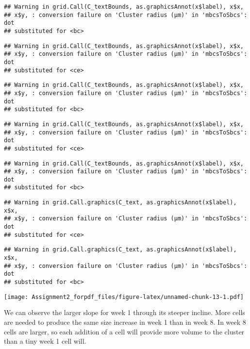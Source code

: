 \documentclass[]{article}
\begin{document}
\begin{verbatim}
## Warning in grid.Call(C_textBounds, as.graphicsAnnot(x$label), x$x,
## x$y, : conversion failure on 'Cluster radius (μm)' in 'mbcsToSbcs': dot
## substituted for <bc>
\end{verbatim}

\begin{verbatim}
## Warning in grid.Call(C_textBounds, as.graphicsAnnot(x$label), x$x,
## x$y, : conversion failure on 'Cluster radius (μm)' in 'mbcsToSbcs': dot
## substituted for <ce>
\end{verbatim}

\begin{verbatim}
## Warning in grid.Call(C_textBounds, as.graphicsAnnot(x$label), x$x,
## x$y, : conversion failure on 'Cluster radius (μm)' in 'mbcsToSbcs': dot
## substituted for <bc>
\end{verbatim}

\begin{verbatim}
## Warning in grid.Call(C_textBounds, as.graphicsAnnot(x$label), x$x,
## x$y, : conversion failure on 'Cluster radius (μm)' in 'mbcsToSbcs': dot
## substituted for <ce>
\end{verbatim}

\begin{verbatim}
## Warning in grid.Call(C_textBounds, as.graphicsAnnot(x$label), x$x,
## x$y, : conversion failure on 'Cluster radius (μm)' in 'mbcsToSbcs': dot
## substituted for <bc>
\end{verbatim}

\begin{verbatim}
## Warning in grid.Call.graphics(C_text, as.graphicsAnnot(x$label), x$x,
## x$y, : conversion failure on 'Cluster radius (μm)' in 'mbcsToSbcs': dot
## substituted for <ce>
\end{verbatim}

\begin{verbatim}
## Warning in grid.Call.graphics(C_text, as.graphicsAnnot(x$label), x$x,
## x$y, : conversion failure on 'Cluster radius (μm)' in 'mbcsToSbcs': dot
## substituted for <bc>
\end{verbatim}

\texttt{[image: Assignment2\_forpdf\_files/figure-latex/unnamed-chunk-13-1.pdf]}

We can observe the larger slope for week 1 through its steeper incline.
More cells are needed to produce the same size increase in week 1 than
in week 8. In week 8 cells are larger, so each addition of a cell will
provide more volume to the cluster than a tiny week 1 cell will.
\end{document}
